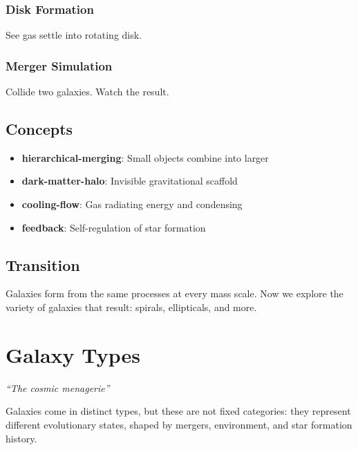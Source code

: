 \documentclass[
  11pt,
  letterpaper,
  twoside,
  openright]{book}
\providecommand{\tightlist}{%
  \setlength{\itemsep}{0pt}\setlength{\parskip}{0pt}}
\begin{document}
\subsection{Disk Formation}\label{disk-formation-1}

See gas settle into rotating disk.

\subsection{Merger Simulation}\label{merger-simulation}

Collide two galaxies. Watch the result.

\section{Concepts}\label{concepts-24}

\begin{itemize}
\tightlist
\item
  \textbf{hierarchical-merging}: Small objects combine into larger
\item
  \textbf{dark-matter-halo}: Invisible gravitational scaffold
\item
  \textbf{cooling-flow}: Gas radiating energy and condensing
\item
  \textbf{feedback}: Self-regulation of star formation
\end{itemize}

\section{Transition}\label{transition-24}

Galaxies form from the same processes at every mass scale. Now we
explore the variety of galaxies that result: spirals, ellipticals, and
more.

\chapter{Galaxy Types}\label{sec-galaxy-types}

\emph{``The cosmic menagerie''}

\begin{tcolorbox}[enhanced jigsaw, leftrule=.75mm, title=\textcolor{quarto-callout-note-color}{\faInfo}\hspace{0.5em}{Key Revelation}, bottomrule=.15mm, opacityback=0, coltitle=black, arc=.35mm, colframe=quarto-callout-note-color-frame, colbacktitle=quarto-callout-note-color!10!white, colback=white, titlerule=0mm, breakable, bottomtitle=1mm, toptitle=1mm, rightrule=.15mm, toprule=.15mm, left=2mm, opacitybacktitle=0.6]

Galaxies come in distinct types, but these are not fixed categories:
they represent different evolutionary states, shaped by mergers,
environment, and star formation history.

\end{tcolorbox}
\end{document}
